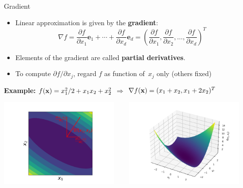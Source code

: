 \documentclass[11pt,compress,t,notes=noshow, xcolor=table]{beamer}
\begin{document}
\begin{vbframe}{Gradient}

\begin{itemize}
    \item Linear approximation is given by the \textbf{gradient}:
        \begin{equation*}
            \nabla f = \frac{\partial f}{\partial x_1} \bm e_1 + \cdots + \frac{\partial f}{\partial x_d} \bm e_d =
            \left(\frac{\partial f}{\partial x_1}, \frac{\partial f}{\partial x_2}, \ldots, \frac{\partial f}{\partial x_d}\right)^T
        \end{equation*}
    \item Elements of the gradient are called \textbf{partial derivatives}.
    \item To compute $\partial f/\partial x_j$, regard $f$ as function of~$x_j$ only (others fixed)
\end{itemize}

\vspace{0.5\baselineskip}

\textbf{Example:} $f(\mathbf{x}) = x_1^2/2 + x_1 x_2 + x_2^2$ $\Rightarrow$ $\nabla f(\mathbf{x}) = (x_1 + x_2, x_1 + 2x_2)^T$

\vspace{-0.5\baselineskip}

\begin{center}
	\includegraphics[width=0.45\textwidth]{figure_man/grad_unit_vectors.png} ~~~ \includegraphics[width=0.45\textwidth]{figure_man/gradient2.png}
\end{center}

\end{vbframe}
\end{document}
